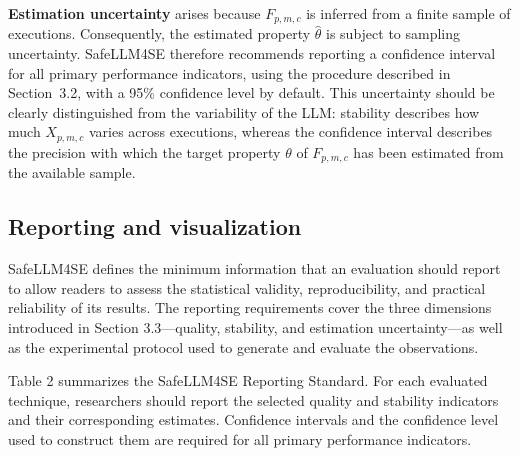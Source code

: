 \documentclass{IEEEcsmag}
\begin{document}
\textbf{Estimation uncertainty} arises because $F_{p,m,c}$ is inferred from a finite sample of executions. Consequently, the estimated property $\hat{\theta}$ is subject to sampling uncertainty. SafeLLM4SE therefore recommends reporting a confidence interval for all primary performance indicators, using the procedure described in Section~3.2, with a 95\% confidence level by default. This uncertainty should be clearly distinguished from the variability of the LLM: stability describes how much $X_{p,m,c}$ varies across executions, whereas the confidence interval describes the precision with which the target property $\theta$ of $F_{p,m,c}$ has been estimated from the available sample.


\subsection{Reporting and visualization}
\label{subsection:SafeLLM4SE:reporting}

SafeLLM4SE defines the minimum information that an evaluation should report to allow readers to assess the statistical validity, reproducibility, and practical reliability of its results. The reporting requirements cover the three dimensions introduced in Section 3.3—quality, stability, and estimation uncertainty—as well as the experimental protocol used to generate and evaluate the observations.

Table 2 summarizes the SafeLLM4SE Reporting Standard. For each evaluated technique, researchers should report the selected quality and stability indicators and their corresponding estimates. Confidence intervals and the confidence level used to construct them are required for all primary performance indicators.
\end{document}
